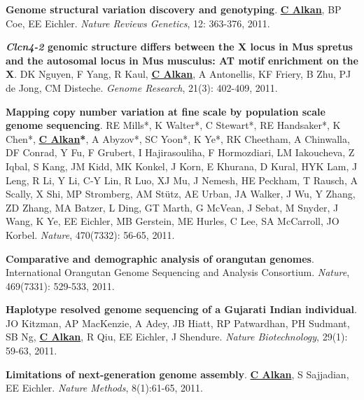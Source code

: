 \vspace{-.2cm}
{\bf Genome structural variation discovery and genotyping}. 
{\bf {\underline {C Alkan}}}, BP Coe, EE Eichler.
{\em Nature Reviews Genetics}, 12: 363-376, 2011.


\vspace{-.2cm}
{\bf {\em Clcn4-2} genomic structure differs between the X locus in Mus spretus and the autosomal 
locus in Mus musculus: AT motif enrichment on the X}.  
DK Nguyen, F Yang, R Kaul, {\bf {\underline {C Alkan}}}, A Antonellis, KF Friery, 
B Zhu, PJ de Jong, CM Disteche. 
{\em Genome Research}, 21(3): 402-409, 2011.

\vspace{-.2cm}
{\bf Mapping copy number variation at fine scale by population scale genome sequencing}.
RE Mills*, K Walter*, C Stewart*, RE Handsaker*, K Chen*, 
{\bf {\underline {C Alkan}*}}, A Abyzov*, SC Yoon*, K Ye*, RK Cheetham, 
A Chinwalla, DF Conrad, Y Fu, F Grubert, I Hajirasouliha, 
F Hormozdiari, LM Iakoucheva, Z Iqbal, S Kang, JM Kidd, 
MK Konkel, J Korn, E Khurana, D Kural, HYK Lam, J Leng, 
R Li, Y Li, C-Y Lin, R Luo, XJ Mu, J Nemesh,
HE Peckham, T Rausch, A Scally, X Shi, MP Stromberg, 
AM St\"{u}tz, AE Urban, JA Walker, J Wu, Y Zhang, 
ZD Zhang, MA Batzer, L Ding, GT Marth, G McVean, 
J Sebat, M Snyder, J Wang, K Ye, EE Eichler, 
MB Gerstein, ME Hurles, C Lee, SA McCarroll,  JO Korbel.
{\em Nature}, 470(7332): 56-65, 2011.

\vspace{-.2cm}
{\bf Comparative and demographic analysis of orangutan genomes}. 
International Orangutan Genome Sequencing and Analysis Consortium.
{\em Nature}, 469(7331): 529-533, 2011.

\clearpage

\vspace{-.2cm}
{\bf Haplotype resolved genome sequencing of a Gujarati Indian individual}.
JO Kitzman, AP MacKenzie, A Adey, JB Hiatt, RP Patwardhan, 
PH Sudmant, SB Ng, {\bf {\underline{C Alkan}}}, R Qiu, EE
Eichler, J Shendure.
{\em Nature Biotechnology}, 29(1): 59-63, 2011.

\vspace{-.2cm}
{\bf Limitations of next-generation genome assembly}.
{\bf {\underline {C Alkan}}}, S Sajjadian, EE Eichler.
{\em Nature Methods}, 8(1):61-65, 2011. \\



